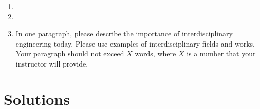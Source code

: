 \documentclass{article}
\begin{document}
\begin{enumerate}
\item %

\item %

\item In one paragraph, please describe the importance of interdisciplinary engineering today. Please use examples of interdisciplinary fields and works. Your paragraph should not exceed $X$ words, where $X$ is a number that your instructor will provide. 
\end{enumerate} %
\newpage
\section*{Solutions}
\end{document}
